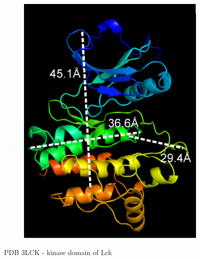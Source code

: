 \documentclass[../AdvancementSummary.tex]{subfiles}
\begin{document}
\begin{figure}[H]
\begin{center}
\begin{subfigure}{0.4\linewidth}
\caption{}
\end{subfigure}
\begin{subfigure}{0.4\linewidth}
\includegraphics[width=\linewidth]{LckPyMol/LWD.eps}
\caption{}
\end{subfigure}
\end{center}
\caption{PDB 3LCK - kinase domain of Lck \label{fig: LckPyMol}}
\end{figure}
\end{document}
